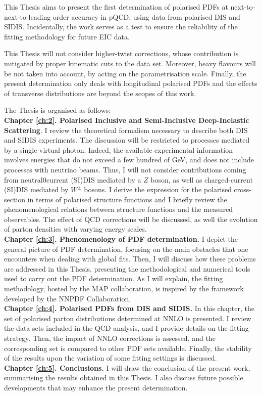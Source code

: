 This Thesis aims to present the first determination of polarised PDFs at next-to-next-to-leading order accuracy in pQCD, using data from polarised DIS and SIDIS. Incidentally, the work serves as a test to ensure the reliability of the fitting methodology for future EIC data.%

This Thesis will not consider higher-twist corrections, whose contribution is mitigated by proper kinematic cuts to the data set. Moreover, heavy flavours will be not taken into account, by acting on the parametrisation scale. Finally, the present determination only deals with longitudinal polarised PDFs and the effects of transverse distributions are beyond the scopes of this work.%

The Thesis is organised as follows:\\[10pt]
\begingroup
\textbf{Chapter \ref{ch:2}. Polarised Inclusive and Semi-Inclusive Deep-Inelastic Scattering}. I review the theoretical formalism necessary to describe both DIS and SIDIS experiments. The discussion will be restricted to processes mediated by a single virtual photon. Indeed, the available experimental information involves energies that do not exceed a few hundred of GeV, and does not include processes with neutrino beams. Thus, I will not consider contributions coming from neutral0current (SI)DIS mediated by a $Z$ boson, as well as charged-current (SI)DIS mediated by $W^{\pm}$ bosons. I derive the expression for the polarised cross-section in terms of polarised structure functions and I briefly review the phenomenological relations between structure functions and the measured observables. The effect of QCD corrections will be discussed, as well the evolution of parton densities with varying energy scales.
\\[5pt]
\textbf{Chapter \ref{ch:3}. Phenomenology of PDF determination.} I depict the general picture of PDF determination, focusing on the main obstacles that one encounters when dealing with global fits. Then, I will discuss how these problems are addressed in this Thesis, presenting the methodological and numerical tools used to carry out the PDF determination. As I will explain, the fitting methodology, hosted by the MAP collaboration, is inspired by the framework developed by the NNPDF Collaboration.
\\[5pt]
\textbf{Chapter \ref{ch:4}. Polarised PDFs from DIS and SIDIS.} In this chapter, the set of polarised parton distributions determined at NNLO is presented. I review the data sets included in the QCD analysis, and I provide details on the fitting strategy. Then, the impact of NNLO corrections is assessed, and the corresponding set is compared to other PDF sets available. Finally, the stability of the results upon the variation of some fitting settings is discussed.
\\[5pt]
\textbf{Chapter \ref{ch:5}. Conclusions.} I will draw the conclusion of the present work, summarising the results obtained in this Thesis. I also discuss future possible developments that may enhance the present determination.
\endgroup